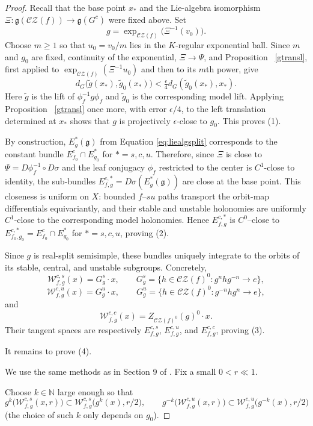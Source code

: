 \documentclass[11pt]{amsart}
\numberwithin{equation}{section}
\newcommand{\CZ}{\mathcal{CZ}}
\theoremstyle{plain}
\begin{document}
\begin{proof}
Recall that the base point $x_\ast$ and the Lie-algebra isomorphism
$\Xi:\mathfrak g(\CZ(f))\to\mathfrak g(G^c)$ were fixed above. Set
 \[
g=\exp_{\CZ(f)}\bigl(\Xi^{-1}(v_0)\bigr).
\]
Choose  $m\ge1$ so that  $u_0=v_0/m$ lies in the $K$-regular exponential
ball.  Since $m$ and $g_0$ are fixed, continuity of the exponential,
$\Xi\to\Psi$, and Proposition ~\ref{gtransl},  first applied to
 $\exp_{\CZ(f)}(\Xi^{-1}u_0)$ and then to  its $m$th power,  give
 \[
d_G\bigl(\tilde g(x_\ast),\tilde g_0(x_\ast)\bigr)
 <\tfrac\epsilon4d_G(\tilde g_0(x_\ast),x_\ast).
\]
Here $\tilde g$ is the lift of  $\phi_f^{-1}g\phi_f$ and  $\tilde g_0$ is
the  corresponding model lift.
 Applying Proposition ~\ref{gtransl} once more,  with error $\epsilon/4$,
to  the left translation determined at $x_\ast$ shows that $g$ is
projectively $\epsilon$-close to $g_0$. This proves (1).

By construction, $E^*_g(\mathfrak g)$ from Equation \ref{eq:liealgsplit} corresponds to the constant bundle
$E^c_{f_0}\cap E^*_{g_0}$ for $*=s,c,u$. Therefore, since $\Xi$ is close to  $\Psi=D\phi_f^{-1} \circ D\sigma$ and the leaf conjugacy  $\phi_f$ restricted to the center is $C^1$-close to identity, the
sub-bundles $E^{c,*}_{f,g}=D\sigma(E^*_g(\mathfrak g))$ are close  at the
base point.  This closeness is uniform on $X$: bounded $f$--$su$ paths
transport the orbit-map differentials equivariantly, and their stable and
unstable holonomies are uniformly $C^1$-close to the corresponding model
holonomies.  Hence $E^{c,*}_{f,g}$ is $C^0$--close to
$E^{c,*}_{f_0,g_0}=E^c_{f_0}\cap E^*_{g_0}$ for $*=s,c,u$, proving (2).

Since  $g$ is real-split semisimple, these bundles uniquely integrate to
the orbits of  its stable, central, and unstable subgroups.  Concretely,
 \[
\mathcal W^{c,s}_{f,g}(x)=G_g^s\cdot x,
\qquad G_g^s=\{h\in\CZ(f)^0:g^nhg^{-n}\to e\},
\]
\[
\mathcal W^{c,u}_{f,g}(x)=G_g^u\cdot x,
\qquad G_g^u=\{h\in\CZ(f)^0:g^{-n}hg^n\to e\},
\]
and
 \[
\mathcal W^{c,c}_{f,g}(x)=Z_{\CZ(f)^0}(g)^0\cdot x.
\]
Their tangent spaces are respectively
$E^{c,s}_{f,g}$, $E^{c,u}_{f,g}$, and $E^{c,c}_{f,g}$, proving (3).

It remains to prove (4). 

We use the same methods as in Section 9 of \cite{PSWholrev}. Fix a small $0<r\ll1$. 

Choose $k\in\mathbb N$ large enough so
that
\[
g^k\big(\mathcal W^{c,s}_{f,g}(x,r)\big)\subset
\mathcal W^{c,s}_{f,g}\big(g^k(x),r/2\big),
\qquad
g^{-k}\big(\mathcal W^{c,u}_{f,g}(x,r)\big)\subset
\mathcal W^{c,u}_{f,g}\big(g^{-k}(x),r/2\big)
\]
(the choice of such $k$ only depends on $g_0$). 


\end{proof}
\end{document}
